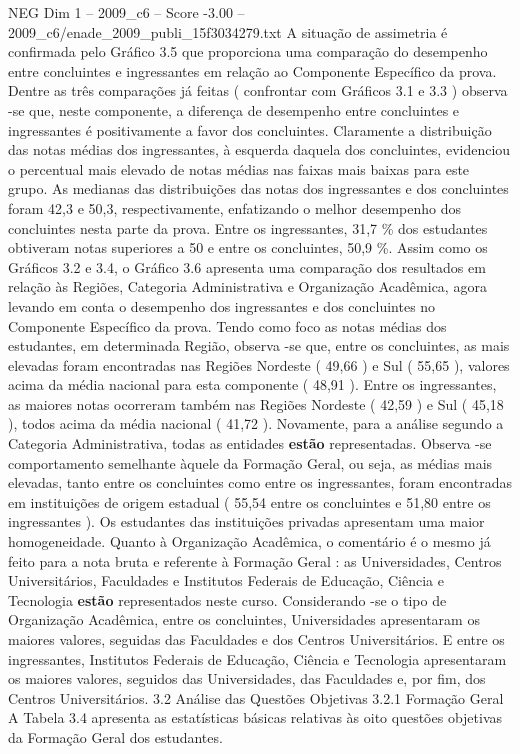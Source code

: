 \begin{textsample}{NEG Dim 1 – 2009\_c6 – Score -3.00 – 2009\_c6/enade\_2009\_publi\_15f3034279.txt}
A situação de assimetria é confirmada pelo Gráfico 3.5 que proporciona uma comparação do desempenho entre concluintes e ingressantes em relação ao Componente Específico da prova.
Dentre as três comparações já feitas ( confrontar com Gráficos 3.1 e 3.3 ) observa -se que, neste componente, a diferença de desempenho entre concluintes e ingressantes é positivamente a favor dos concluintes.
Claramente a distribuição das notas médias dos ingressantes, à esquerda daquela dos concluintes, evidenciou o percentual mais elevado de notas médias nas faixas mais baixas para este grupo.
As medianas das distribuições das notas dos ingressantes e dos concluintes foram 42,3 e 50,3, respectivamente, enfatizando o melhor desempenho dos concluintes nesta parte da prova.
Entre os ingressantes, 31,7 \% dos estudantes obtiveram notas superiores a 50 e entre os concluintes, 50,9 \%.
Assim como os Gráficos 3.2 e 3.4, o Gráfico 3.6 apresenta uma comparação dos resultados em relação às Regiões, Categoria Administrativa e Organização Acadêmica, agora levando em conta o desempenho dos ingressantes e dos concluintes no Componente Específico da prova.
Tendo como foco as notas médias dos estudantes, em determinada Região, observa -se que, entre os concluintes, as mais elevadas foram encontradas nas Regiões Nordeste ( 49,66 ) e Sul ( 55,65 ), valores acima da média nacional para esta componente ( 48,91 ).
Entre os ingressantes, as maiores notas ocorreram também nas Regiões Nordeste ( 42,59 ) e Sul ( 45,18 ), todos acima da média nacional ( 41,72 ).
Novamente, para a análise segundo a Categoria Administrativa, todas as entidades \textbf{estão} representadas.
Observa -se comportamento semelhante àquele da Formação Geral, ou seja, as médias mais elevadas, tanto entre os concluintes como entre os ingressantes, foram encontradas em instituições de origem estadual ( 55,54 entre os concluintes e 51,80 entre os ingressantes ).
Os estudantes das instituições privadas apresentam uma maior homogeneidade.
Quanto à Organização Acadêmica, o comentário é o mesmo já feito para a nota bruta e referente à Formação Geral : as Universidades, Centros Universitários, Faculdades e Institutos Federais de Educação, Ciência e Tecnologia \textbf{estão} representados neste curso.
Considerando -se o tipo de Organização Acadêmica, entre os concluintes, Universidades apresentaram os maiores valores, seguidas das Faculdades e dos Centros Universitários.
E entre os ingressantes, Institutos Federais de Educação, Ciência e Tecnologia apresentaram os maiores valores, seguidos das Universidades, das Faculdades e, por fim, dos Centros Universitários. 3.2 Análise das Questões Objetivas 3.2.1 Formação Geral A Tabela 3.4 apresenta as estatísticas básicas relativas às oito questões objetivas da Formação Geral dos estudantes.

\end{textsample}
